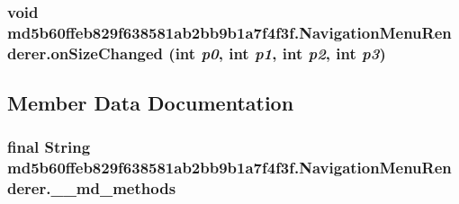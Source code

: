 \hypertarget{classmd5b60ffeb829f638581ab2bb9b1a7f4f3f_1_1_navigation_menu_renderer_9eb26dd23dc63aa4a5652b61f28def49}{
\subsubsection[{onSizeChanged}]{\setlength{\rightskip}{0pt plus 5cm}void md5b60ffeb829f638581ab2bb9b1a7f4f3f.NavigationMenuRenderer.onSizeChanged (int {\em p0}, \/  int {\em p1}, \/  int {\em p2}, \/  int {\em p3})}}
\label{classmd5b60ffeb829f638581ab2bb9b1a7f4f3f_1_1_navigation_menu_renderer_9eb26dd23dc63aa4a5652b61f28def49}




\subsection{Member Data Documentation}
\hypertarget{classmd5b60ffeb829f638581ab2bb9b1a7f4f3f_1_1_navigation_menu_renderer_0f4bfebe2cdfd607a2a7599e832cfbdc}{
\subsubsection[{\_\-\_\-md\_\-methods}]{\setlength{\rightskip}{0pt plus 5cm}final String {\bf md5b60ffeb829f638581ab2bb9b1a7f4f3f.NavigationMenuRenderer.\_\-\_\-md\_\-methods}}}
\label{classmd5b60ffeb829f638581ab2bb9b1a7f4f3f_1_1_navigation_menu_renderer_0f4bfebe2cdfd607a2a7599e832cfbdc}




